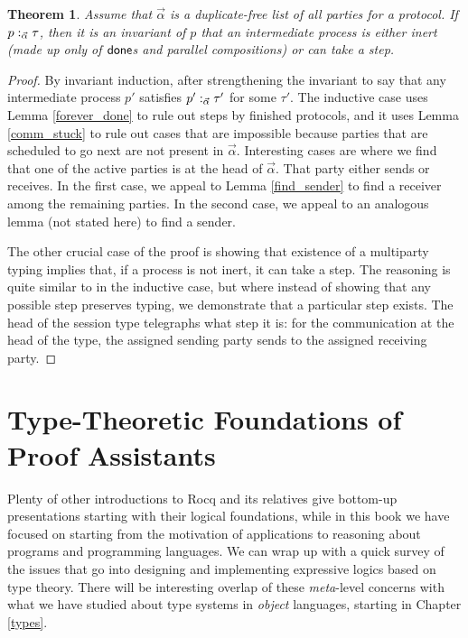 \documentclass{amsbook}
\newtheorem{theorem}{Theorem}[chapter]
\theoremstyle{definition}
\theoremstyle{remark}
\numberwithin{section}{chapter}
\numberwithin{equation}{chapter}
\begin{document}
\begin{theorem}
  Assume that $\vec{\alpha}$ is a duplicate-free list of \emph{all} parties for a protocol.
  If $p :_{\vec{\alpha}} \tau$, then it is an invariant of $p$ that an intermediate process is either inert (made up only of $\mathsf{done}$s and parallel compositions) or can take a step.
\end{theorem}
\begin{proof}
  By invariant induction, after strengthening the invariant to say that any intermediate process $p'$ satisfies $p' :_{\vec{\alpha}} \tau'$ for some $\tau'$.
  The inductive case uses Lemma \ref{forever_done} to rule out steps by finished protocols, and it uses Lemma \ref{comm_stuck} to rule out cases that are impossible because parties that are scheduled to go next are not present in $\vec{\alpha}$.
  Interesting cases are where we find that one of the active parties is at the head of $\vec{\alpha}$.
  That party either sends or receives.
  In the first case, we appeal to Lemma \ref{find_sender} to find a receiver among the remaining parties.
  In the second case, we appeal to an analogous lemma (not stated here) to find a sender.

  The other crucial case of the proof is showing that existence of a multiparty typing implies that, if a process is not inert, it can take a step.
  The reasoning is quite similar to in the inductive case, but where instead of showing that any possible step preserves typing, we demonstrate that a particular step exists.
  The head of the session type telegraphs what step it is: for the communication at the head of the type, the assigned sending party sends to the assigned receiving party.
\end{proof}



\chapter{Type-Theoretic Foundations of Proof Assistants}\label{foundations}

Plenty of other introductions to Rocq and its relatives give bottom-up presentations starting with their logical foundations, while in this book we have focused on starting from the motivation of applications to reasoning about programs and programming languages.
We can wrap up with a quick survey of the issues that go into designing and implementing expressive logics based on type theory.
There will be interesting overlap of these \emph{meta}-level concerns with what we have studied about type systems in \emph{object} languages, starting in Chapter \ref{types}.
\end{document}
